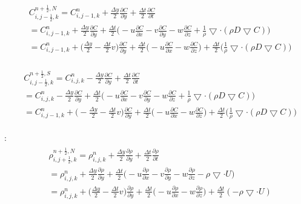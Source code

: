 \documentclass{article}
\numberwithin{equation}{subsection}
\begin{document}
\begin{align}
\begin{split}
& C_{i,j-\frac{1}{2},k}^{n+\frac{1}{2},N} = C_{i,j-1,k}^n + \frac{\Delta y}{2} \frac{\partial C}{\partial y} + \frac{\Delta t}{2} \frac{\partial C}{\partial t} \\
&= C_{i,j-1,k}^{n} + \frac{\Delta y}{2} \frac{\partial C}{\partial y} + \frac{\Delta t}{2} \Big( -u\frac{\partial C}{\partial x} - v\frac{\partial C}{\partial y} - w\frac{\partial C}{\partial z} + \frac{1}{\rho} \bigtriangledown \cdot( \rho D \bigtriangledown C) \Big) \\
&= C_{i,j-1,k}^{n} + \Big( \frac{\Delta y}{2} - \frac{\Delta t}{2}v\Big)\frac{\partial C}{\partial y} + \frac{\Delta t}{2} \Big( -u\frac{\partial C}{\partial x} -w\frac{\partial C}{\partial z} \big) + \frac{\Delta t}{2} \Big( \frac{1}{\rho} \bigtriangledown \cdot( \rho D \bigtriangledown C)\Big)
\end{split}
\end{align}

\begin{align}
\begin{split}
& C_{i,j-\frac{1}{2},k}^{n+\frac{1}{2},S} = C_{i,j,k}^n - \frac{\Delta y}{2} \frac{\partial C}{\partial y} + \frac{\Delta t}{2} \frac{\partial C}{\partial t} \\
&= C_{i,j,k}^{n} - \frac{\Delta y}{2} \frac{\partial C}{\partial y} + \frac{\Delta t}{2} \Big( -u\frac{\partial C}{\partial x} - v\frac{\partial C}{\partial y} - w\frac{\partial C}{\partial z} + \frac{1}{\rho} \bigtriangledown \cdot( \rho D \bigtriangledown C) \Big) \\
&= C_{i,j-1,k}^{n} + \Big( -\frac{\Delta y}{2} - \frac{\Delta t}{2}v\Big)\frac{\partial C}{\partial y} + \frac{\Delta t}{2} \Big( -u\frac{\partial C}{\partial x} -w\frac{\partial C}{\partial z} \big) + \frac{\Delta t}{2} \Big( \frac{1}{\rho} \bigtriangledown \cdot( \rho D \bigtriangledown C)\Big)
\end{split}
\end{align}


:
\begin{align}
\begin{split}
& \rho_{i,j+\frac{1}{2},k}^{n+\frac{1}{2},N} = \rho_{i,j,k}^n + \frac{\Delta y}{2} \frac{\partial \rho}{\partial y} + \frac{\Delta t}{2} \frac{\partial \rho}{\partial t} \\
& = \rho_{i,j,k}^{n} + \frac{\Delta y}{2} \frac{\partial \rho}{\partial y} + \frac{\Delta t}{2} \Big( -u\frac{\partial \rho}{\partial x} - v\frac{\partial \rho}{\partial y} - w\frac{\partial \rho}{\partial z} - \rho \bigtriangledown \cdot U \Big) \\
& = \rho_{i,j,k}^{n} + \big( \frac{\Delta y}{2} - \frac{\Delta t}{2}v\big)\frac{\partial \rho}{\partial y} + \frac{\Delta t}{2} \big( - u\frac{\partial \rho}{\partial x} - w\frac{\partial \rho}{\partial z} \big) + \frac{\Delta t}{2} (-\rho \bigtriangledown \cdot U)
\end{split}
\end{align}
\end{document}
